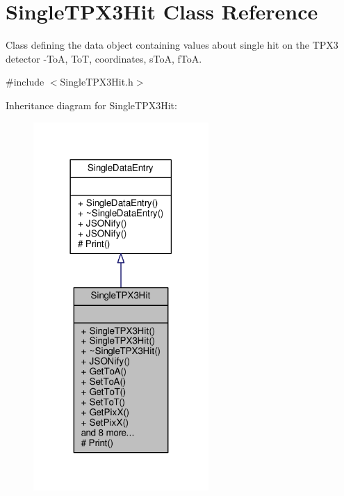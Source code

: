 \hypertarget{classSingleTPX3Hit}{\section{Single\+T\+P\+X3\+Hit Class Reference}
\label{classSingleTPX3Hit}
}


Class defining the data object containing values about single hit on the T\+P\+X3 detector -\/\+To\+A, To\+T, coordinates, s\+To\+A, f\+To\+A.  




{\ttfamily \#include $<$Single\+T\+P\+X3\+Hit.\+h$>$}



Inheritance diagram for Single\+T\+P\+X3\+Hit\+:
\nopagebreak
\begin{figure}[H]
\begin{center}
\leavevmode
\includegraphics[width=189pt]{classSingleTPX3Hit__inherit__graph}
\end{center}
\end{figure}


